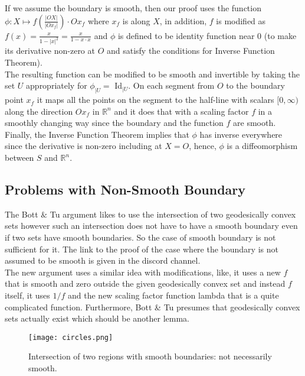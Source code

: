 \documentclass[12pt]{amsart}
\theoremstyle{remark}
\begin{document}
\indent\indent If we assume the boundary is smooth, then our proof uses the function $\phi : X \mapsto f(\frac{|OX|}{|Ox_f|}) \cdot Ox_f$ where $x_f$ is along $X$, in addition, $f$ is modified as $f(x) = \frac{x}{1 - |x|^2} = \frac{x}{1 - x\cdot x}$ and $\phi$ is defined to be identity function near 0 (to make its derivative non-zero at $O$ and satisfy the conditions for Inverse Function Theorem). \\
\indent The resulting function can be modified to be smooth and invertible by taking the set $U$ appropriately for $\phi_{|U} = $ Id$_{|U}$. On each segment from $O$ to the boundary point $x_f$ it maps all the points on the segment to the half-line with scalars $[0, \infty)$ along the direction $Ox_f$ in $\mathbb{R}^n$ and it does that with a scaling factor $f$ in a smoothly changing way since the boundary and the function $f$ are smooth. Finally, the Inverse Function Theorem implies that $\phi$ has inverse everywhere since the derivative is non-zero including at $X = O$, hence, $\phi$ is a diffeomorphism between $S$ and $\mathbb{R}^n.$ \\



\subsection{Problems with Non-Smooth Boundary}

\indent \indent The Bott $\&$ Tu argument likes to use the intersection of two geodesically convex sets however such an intersection does not have to have a smooth boundary even if two sets have smooth boundaries. So the case of smooth boundary is not sufficient for it. The link to the proof of the case where the boundary is not assumed to be smooth is given in the discord channel. \\
\indent The new argument uses a similar idea with modifications, like, it uses a new $f$ that is smooth and zero outside the given geodesically convex set and instead $f$ itself, it uses $1/f$ and the new scaling factor function lambda that is a quite complicated function. Furthermore, Bott \& Tu presumes that geodesically convex sets actually exist which should be another lemma. \\

\begin{figure}[h]
    \centering
    \texttt{[image: circles.png]}
    \caption{Intersection of two regions with smooth boundaries: not necessarily smooth.}
    \label{fig:circles_inter}
\end{figure}
\end{document}
